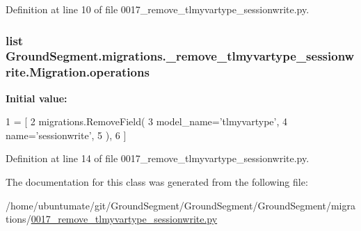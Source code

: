 Definition at line 10 of file 0017\+\_\+remove\+\_\+tlmyvartype\+\_\+sessionwrite.\+py.

\hypertarget{class_ground_segment_1_1migrations_1_10017__remove__tlmyvartype__sessionwrite_1_1_migration_a8c1bd604c6975a90c7ff8dae829c99d0}{}
\subsubsection[{operations}]{\setlength{\rightskip}{0pt plus 5cm}list Ground\+Segment.\+migrations.\+\_\+remove\+\_\+tlmyvartype\+\_\+sessionwrite.\+Migration.\+operations\hspace{0.3cm}{\ttfamily [static]}}\label{class_ground_segment_1_1migrations_1_10017__remove__tlmyvartype__sessionwrite_1_1_migration_a8c1bd604c6975a90c7ff8dae829c99d0}
{\bfseries Initial value\+:}
\begin{DoxyCode}
1 = [
2         migrations.RemoveField(
3             model\_name=\textcolor{stringliteral}{'tlmyvartype'},
4             name=\textcolor{stringliteral}{'sessionwrite'},
5         ),
6     ]
\end{DoxyCode}


Definition at line 14 of file 0017\+\_\+remove\+\_\+tlmyvartype\+\_\+sessionwrite.\+py.



The documentation for this class was generated from the following file\+:\begin{DoxyCompactItemize}
\item 
/home/ubuntumate/git/\+Ground\+Segment/\+Ground\+Segment/\+Ground\+Segment/migrations/\hyperlink{0017__remove__tlmyvartype__sessionwrite_8py}{0017\+\_\+remove\+\_\+tlmyvartype\+\_\+sessionwrite.\+py}\end{DoxyCompactItemize}
